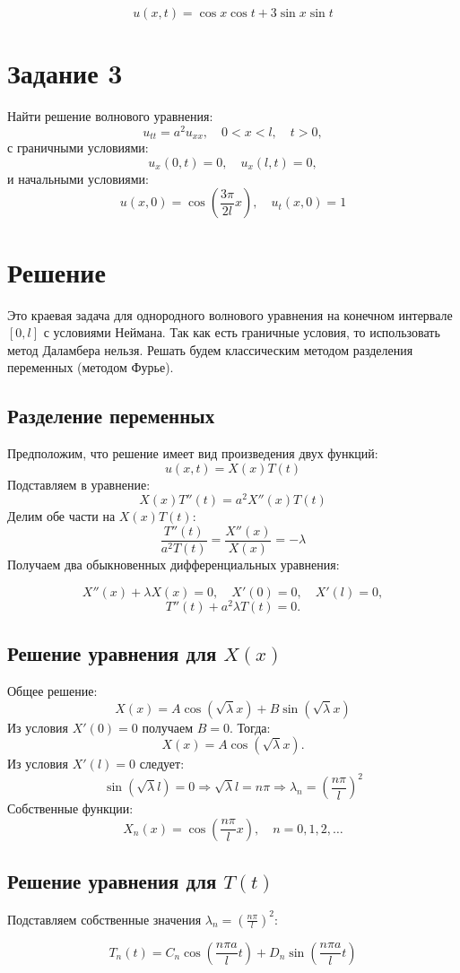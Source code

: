 \documentclass{article}
\begin{document}
$$
\boxed{u(x, t) = \cos x \cos t + 3 \sin x \sin t}
$$




\section*{Задание 3}
Найти решение волнового уравнения:
$$
u_{tt} = a^2 u_{xx}, \quad 0 < x < l, \quad t > 0,
$$
с граничными условиями:
$$
u_x(0, t) = 0, \quad u_x(l, t) = 0,
$$
и начальными условиями:
$$
u(x, 0) = \cos\left(\frac{3\pi}{2l}x\right), \quad u_t(x, 0) = 1
$$
\section*{Решение}
Это краевая задача для однородного волнового уравнения на конечном интервале $ [0, l] $ с условиями Неймана. Так как есть граничные условия, то использовать метод Даламбера нельзя. Решать будем классическим методом разделения переменных (методом Фурье).
\subsection{Разделение переменных}
Предположим, что решение имеет вид произведения двух функций:
$$
u(x, t) = X(x)T(t)
$$
Подставляем в уравнение:
$$
X(x)T''(t) = a^2 X''(x)T(t)
$$
Делим обе части на $ X(x)T(t) $:
$$
\frac{T''(t)}{a^2 T(t)} = \frac{X''(x)}{X(x)} = -\lambda
$$
Получаем два обыкновенных дифференциальных уравнения:

$$
X''(x) + \lambda X(x) = 0, \quad X'(0) = 0, \quad X'(l) = 0,
$$
$$
T''(t) + a^2 \lambda T(t) = 0.
$$
\subsection{Решение уравнения для $ X(x) $}
Общее решение:
$$
X(x) = A \cos(\sqrt{\lambda}x) + B \sin(\sqrt{\lambda}x)
$$
Из условия $ X'(0) = 0 $ получаем $ B = 0 $. Тогда:
$$
X(x) = A \cos(\sqrt{\lambda}x).
$$
Из условия $ X'(l) = 0 $ следует:
$$
\sin(\sqrt{\lambda}l) = 0 \Rightarrow \sqrt{\lambda}l = n\pi \Rightarrow \lambda_n = \left(\frac{n\pi}{l}\right)^2
$$
Собственные функции:
$$
X_n(x) = \cos\left(\frac{n\pi}{l}x\right), \quad n = 0, 1, 2, \dots
$$
\subsection{Решение уравнения для $ T(t) $}
Подставляем собственные значения $ \lambda_n = \left(\frac{n\pi}{l}\right)^2 $:

$$
T_n(t) = C_n \cos\left(\frac{n\pi a}{l}t\right) + D_n \sin\left(\frac{n\pi a}{l}t\right)
$$
\end{document}
